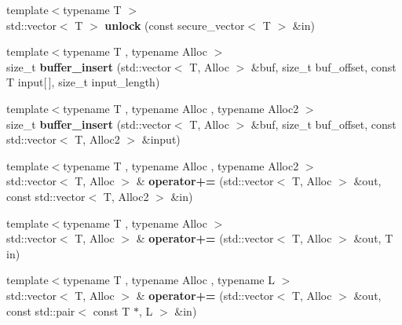 \begin{DoxyCompactItemize}
\item 
\mbox{\label{namespace_botan_a07b99a8cd5ed8949c8645dc15c8b6659}} 
{\footnotesize template$<$typename T $>$ }\\std\+::vector$<$ T $>$ {\bfseries unlock} (const secure\+\_\+vector$<$ T $>$ \&in)
\item 
\mbox{\label{namespace_botan_a19af9a711ecf7ae0dd3a64138fc6dc3b}} 
{\footnotesize template$<$typename T , typename Alloc $>$ }\\size\+\_\+t {\bfseries buffer\+\_\+insert} (std\+::vector$<$ T, Alloc $>$ \&buf, size\+\_\+t buf\+\_\+offset, const T input\mbox{[}$\,$\mbox{]}, size\+\_\+t input\+\_\+length)
\item 
\mbox{\label{namespace_botan_a22388053c63ffb34d665e5fcae148e14}} 
{\footnotesize template$<$typename T , typename Alloc , typename Alloc2 $>$ }\\size\+\_\+t {\bfseries buffer\+\_\+insert} (std\+::vector$<$ T, Alloc $>$ \&buf, size\+\_\+t buf\+\_\+offset, const std\+::vector$<$ T, Alloc2 $>$ \&input)
\item 
\mbox{\label{namespace_botan_a9bbc58ad326d5e720297c3f29a1d9dd1}} 
{\footnotesize template$<$typename T , typename Alloc , typename Alloc2 $>$ }\\std\+::vector$<$ T, Alloc $>$ \& {\bfseries operator+=} (std\+::vector$<$ T, Alloc $>$ \&out, const std\+::vector$<$ T, Alloc2 $>$ \&in)
\item 
\mbox{\label{namespace_botan_a906697de956a6e0d5a61249aa3bb525f}} 
{\footnotesize template$<$typename T , typename Alloc $>$ }\\std\+::vector$<$ T, Alloc $>$ \& {\bfseries operator+=} (std\+::vector$<$ T, Alloc $>$ \&out, T in)
\item 
\mbox{\label{namespace_botan_a723c2af7ffb9a2e5165f95db713c55d3}} 
{\footnotesize template$<$typename T , typename Alloc , typename L $>$ }\\std\+::vector$<$ T, Alloc $>$ \& {\bfseries operator+=} (std\+::vector$<$ T, Alloc $>$ \&out, const std\+::pair$<$ const T $\ast$, L $>$ \&in)
\item 
\mbox{\label{namespace_botan_a777e3c75fe36a1a4933b1ad4a8ce9b07}} 

\end{DoxyCompactItemize}
